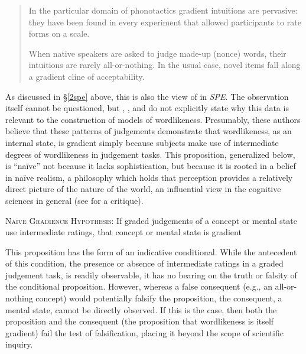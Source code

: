 \begin{quote}
In the particular domain of phonotactics gradient intuitions are pervasive: they have been found in every experiment that allowed participants to rate forms on a scale.
\citep[][382]{Hayes2008a}

When native speakers are asked to judge made-up (nonce) words, their intuitions are rarely all-or-nothing. In the usual case, novel items fall along a gradient cline of acceptability. \citep[][9]{Albright2009a}
\end{quote}

As discussed in \S\ref{2spe} above, this is also the view of \citeauthor{SPE} in \emph{SPE}. The observation itself cannot be questioned, but \citeauthor{SPE}, \citeauthor{Hayes2008a}, and \citeauthor{Albright2009a} do not explicitly state why this data is relevant to the construction of models of wordlikeness. Presumably, these authors believe that these patterns of judgements demonstrate that wordlikeness, as an internal state, is gradient simply because subjects make use of intermediate degrees of wordlikeness in judgement tasks. This proposition, generalized below, is ``naïve'' not because it lacks sophistication, but because it is rooted in a belief in naïve realism, a philosophy which holds that perception provides a relatively direct picture of the nature of the world, an influential view in the cognitive sciences in general (see \citealt{Fodor1981a} for a critique).

\begin{unlabeledexample}
\textsc{Naïve Gradience Hypothesis}: If graded judgements of a concept or mental state use intermediate ratings, that concept or mental state is gradient
\end{unlabeledexample}




This proposition has the form of an indicative conditional. While the antecedent of this condition, the presence or absence of intermediate ratings in a graded judgement task, is readily observable, it has no bearing on the truth or falsity of the conditional proposition. However, whereas a false consequent (e.g., an all-or-nothing concept) would potentially falsify the proposition, the consequent, a mental state, cannot be directly observed. If this is the case, then both the proposition and the consequent (the proposition that wordlikeness is itself gradient) fail the test of falsification, placing it beyond the scope of scientific inquiry.







